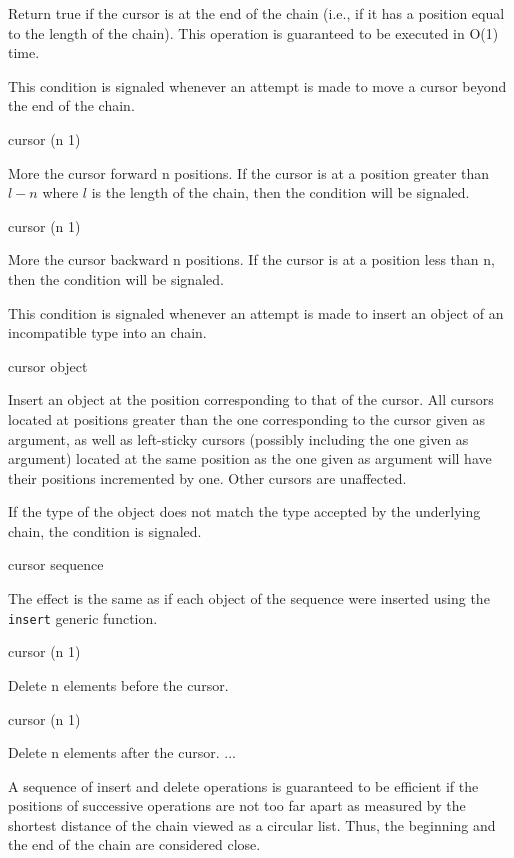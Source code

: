 \documentclass[11pt]{article}
\begin{document}
Return true if the cursor is at the end of the chain (i.e., if it has
a position equal to the length of the chain).  This operation is
guaranteed to be executed in O(1) time.


This condition is signaled whenever an attempt is made to move a
cursor beyond the end of the chain. 

 {cursor \optional (n 1)}

More the cursor forward n positions.  If the cursor is at a position
greater than $l - n$ where $l$ is the length of the chain, then the
condition  will be signaled. 

 {cursor \optional (n 1)}

More the cursor backward n positions.  If the cursor is at a
position less than n, then the condition  will be
signaled.


This condition is signaled whenever an attempt is made to insert an
object of an incompatible type into an chain. 

 {cursor object}

Insert an object at the position corresponding to that of the cursor. 
All cursors located at positions greater than the one corresponding to
the cursor given as argument, as well as left-sticky cursors (possibly
including the one given as argument)  located at the same position as
the one given as argument will have their positions incremented by
one. Other cursors are unaffected. 

If the type of the object does not match the type accepted by the
underlying chain, the  condition is
signaled.

 {cursor sequence}

The effect is the same as if each object of the sequence were
inserted using the \texttt{insert} generic function. 

 {cursor \optional (n 1)}

Delete n elements before the cursor.

 {cursor \optional (n 1)}

Delete n elements after the cursor.  ...

A sequence of insert and delete operations is guaranteed to be
efficient if the positions of successive operations are not too far
apart as measured by the shortest distance of the chain viewed as a
circular list.  Thus, the beginning and the end of the chain are
considered close.
\end{document}
